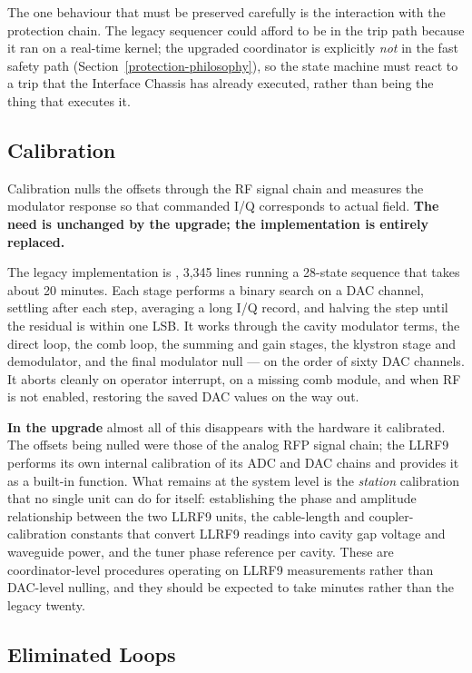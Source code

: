 The one behaviour that must be preserved carefully is the interaction with the protection chain. The legacy sequencer could afford to be in the trip path because it ran on a real-time kernel; the upgraded coordinator is explicitly \emph{not} in the fast safety path (Section~\ref{protection-philosophy}), so the state machine must react to a trip that the Interface Chassis has already executed, rather than being the thing that executes it.

\subsection{Calibration}\label{calibration}

Calibration nulls the offsets through the RF signal chain and measures the modulator response so that commanded I/Q corresponds to actual field. \textbf{The need is unchanged by the upgrade; the implementation is entirely replaced.}

The legacy implementation is , 3,345 lines running a 28-state sequence that takes about 20 minutes. Each stage performs a binary search on a DAC channel, settling after each step, averaging a long I/Q record, and halving the step until the residual is within one LSB. It works through the cavity modulator terms, the direct loop, the comb loop, the summing and gain stages, the klystron stage and demodulator, and the final modulator null --- on the order of sixty DAC channels. It aborts cleanly on operator interrupt, on a missing comb module, and when RF is not enabled, restoring the saved DAC values on the way out.

\textbf{In the upgrade} almost all of this disappears with the hardware it calibrated. The offsets being nulled were those of the analog RFP signal chain; the LLRF9 performs its own internal calibration of its ADC and DAC chains and provides it as a built-in function. What remains at the system level is the \emph{station} calibration that no single unit can do for itself: establishing the phase and amplitude relationship between the two LLRF9 units, the cable-length and coupler-calibration constants that convert LLRF9 readings into cavity gap voltage and waveguide power, and the tuner phase reference per cavity. These are coordinator-level procedures operating on LLRF9 measurements rather than DAC-level nulling, and they should be expected to take minutes rather than the legacy twenty.

\subsection{Eliminated Loops}\label{eliminated-loops}

